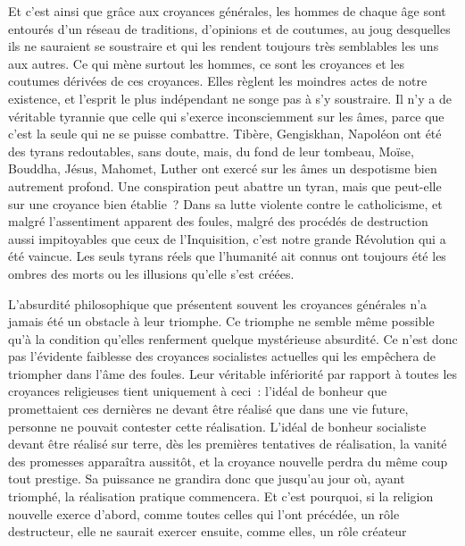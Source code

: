\documentclass[french,twoside]{book} %
\begin{document}
Et c’est ainsi que grâce aux croyances générales, les hommes de chaque âge sont entourés d’un réseau de traditions, d’opinions et de coutumes, au joug desquelles ils ne sauraient se soustraire et qui les rendent toujours très semblables les uns aux autres. Ce qui mène sur­tout les hommes, ce sont les croyances et les coutumes dérivées de ces croyances. Elles règlent les moindres actes de notre existence, et l’esprit le plus indépendant ne songe pas à s’y soustraire. Il n’y a de véritable tyran­nie que celle qui s’exerce inconsciemment sur les âmes, parce que c’est la seule qui ne se puisse com­battre. Tibère, Gengiskhan, Napoléon ont été des tyrans redoutables, sans doute, mais, du fond de leur tombeau, Moïse, Bouddha, Jésus, Mahomet, Luther ont exercé sur les âmes un despotisme bien autrement profond. Une conspiration peut abattre un tyran, mais que peut-elle sur une croyance bien établie ? Dans sa lutte violente contre le catholicisme, et malgré l’assentiment apparent des foules, malgré des procédés de destruction aussi impitoyables que ceux de l’Inquisition, c’est notre grande Révolution qui a été vaincue. Les seuls tyrans réels que l’humanité ait connus ont toujours été les ombres des morts ou les illusions qu’elle s’est créées.\par
L’absurdité philosophique que présentent souvent les croyances générales n’a jamais été un obstacle à leur triomphe. Ce triomphe ne semble même possible qu’à la condition qu’elles renferment quelque mystérieuse absurdité. Ce n’est donc pas l’évidente faiblesse des croyances socialistes actuelles qui les empêchera de triompher dans l’âme des foules. Leur véritable infériorité par rapport à toutes les croyances religieuses tient uniquement à ceci : l’idéal de bonheur que promettaient ces dernières ne devant être réalisé que dans une vie future, personne ne pouvait contester cette réalisation. L’idéal de bonheur socialiste devant être réalisé sur terre, dès les premiè­res tentatives de réalisation, la vanité des promesses apparaîtra aussitôt, et la croyance nouvelle perdra du même coup tout prestige. Sa puissance ne grandira donc que jusqu’au jour où, ayant triomphé, la réalisation pratique commencera. Et c’est pour­quoi, si la religion nouvelle exerce d’abord, comme toutes celles qui l’ont précédée, un rôle destructeur, elle ne saurait exercer ensuite, comme elles, un rôle créateur
\end{document}
